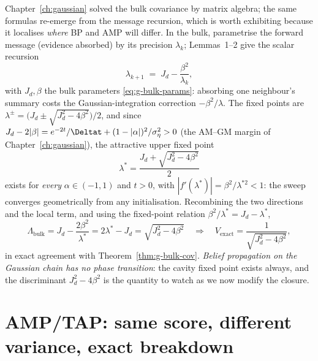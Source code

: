 Chapter~\ref{ch:gaussian} solved the bulk covariance by matrix algebra;
the same formulas re-emerge from the message recursion, which is worth
exhibiting because it localises \emph{where} BP and AMP will differ. In
the bulk, parametrise the forward message (evidence absorbed) by its
precision $\lambda_k$; Lemmas~1--2 give the scalar recursion
\begin{equation}
  \lambda_{k+1} \;=\; J_d - \frac{\beta^2}{\lambda_k},
  \label{eq:bp-cavity}
\end{equation}
with $J_d, \beta$ the bulk parameters \eqref{eq:g-bulk-params}: absorbing
one neighbour's summary costs the Gaussian-integration correction
$-\beta^2/\lambda$. The fixed points are
$\lambda^\pm = \big( J_d \pm \sqrt{J_d^2 - 4\beta^2} \big)/2$, and since
$J_d - 2|\beta| = e^{-2t}/\Deltat + (1 - |\alpha|)^2/\sigma_\eta^2 > 0$
(the AM--GM margin of Chapter~\ref{ch:gaussian}), the attractive upper
fixed point
\begin{equation}
  \boxed{\;\lambda^\ast = \frac{J_d + \sqrt{J_d^2 - 4\beta^2}}{2}\;}
  \label{eq:bp-lambdastar}
\end{equation}
exists for \emph{every} $\alpha \in (-1,1)$ and $t > 0$, with
$|f'(\lambda^\ast)| = \beta^2/\lambda^{\ast 2} < 1$: the sweep converges
geometrically from any initialisation. Recombining the two directions and
the local term, and using the fixed-point relation
$\beta^2/\lambda^\ast = J_d - \lambda^\ast$,
\begin{equation}
  \Lambda_{\mathrm{bulk}}
  = J_d - \frac{2\beta^2}{\lambda^\ast}
  = 2\lambda^\ast - J_d
  = \sqrt{J_d^2 - 4\beta^2}
  \quad\Longrightarrow\quad
  V_{\mathrm{exact}} = \frac{1}{\sqrt{J_d^2 - 4\beta^2}} ,
  \label{eq:bp-bulkvar}
\end{equation}
in exact agreement with Theorem~\ref{thm:g-bulk-cov}. \emph{Belief
propagation on the Gaussian chain has no phase transition}: the cavity
fixed point exists always, and the discriminant $J_d^2 - 4\beta^2$ is the
quantity to watch as we now modify the closure.

\section{AMP/TAP: same score, different variance, exact breakdown}
\label{sec:bp-amp}

